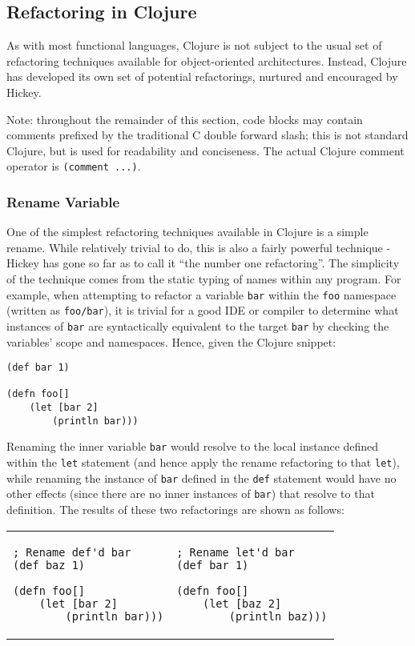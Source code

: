\subsection{Refactoring in Clojure}

As with most functional languages, Clojure is not subject to the usual set of refactoring techniques available for object-oriented architectures. Instead, Clojure has developed its own set of potential refactorings, nurtured and encouraged by Hickey.

Note: throughout the remainder of this section, code blocks may contain comments prefixed by the traditional C double forward slash; this is not standard Clojure, but is used for readability and conciseness. The actual Clojure comment operator is \verb!(comment ...)!.

\subsubsection{Rename Variable}

One of the simplest refactoring techniques available in Clojure is a simple rename. While relatively trivial to do, this is also a fairly powerful technique - Hickey has gone so far as to call it ``the number one refactoring''\cite{rerefactoring}. The simplicity of the technique comes from the static typing of names within any program. For example, when attempting to refactor a variable \verb!bar! within the \verb!foo! namespace (written as \verb!foo/bar!), it is trivial for a good IDE or compiler to determine what instances of \verb!bar! are syntactically equivalent to the target \verb!bar! by checking the variables' scope and namespaces. Hence, given the Clojure snippet:

\begin{verbatim}
(def bar 1)

(defn foo[]
    (let [bar 2]
        (println bar)))
\end{verbatim}

Renaming the inner variable \verb!bar! would resolve to the local instance defined within the \verb!let! statement (and hence apply the rename refactoring to that \verb!let!), while renaming the instance of \verb!bar! defined in the \verb!def! statement would have no other effects (since there are no inner instances of \verb!bar!) that resolve to that definition. The results of these two refactorings are shown as follows:

\begin{tabular}{m{2in} m{2in}} \\
\begin{verbatim}
; Rename def'd bar
(def baz 1)

(defn foo[]
    (let [bar 2]
        (println bar)))
\end{verbatim}
&
\begin{verbatim}
; Rename let'd bar
(def bar 1)

(defn foo[]
    (let [baz 2]
        (println baz)))
\end{verbatim}
\end{tabular}

